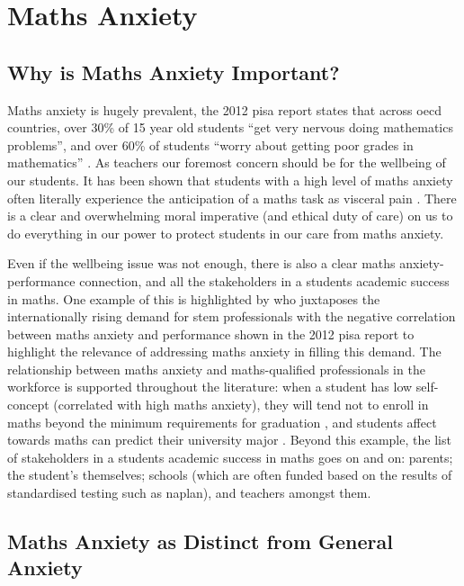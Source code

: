 \documentclass[twoside,12pt,a4paper]{report}
\begin{document}
\section{Maths Anxiety}


\subsection*{Why is Maths Anxiety Important?}

Maths anxiety is hugely prevalent, the 2012 \gls{pisa} report states that across \gls{oecd} countries, over 30\% of 15 year old students ``get very nervous doing mathematics problems'', and over 60\% of students ``worry about getting poor grades in mathematics''  \cite{PISA2013}. As teachers our foremost concern should be for the wellbeing of our students. It has been shown that students with a high level of maths anxiety often literally experience the anticipation of a maths task as visceral pain \cite{Lyons2012pain}. There is a clear and overwhelming moral imperative (and ethical duty of care) on us to do everything in our power to protect students in our care from maths anxiety.

Even if the wellbeing issue was not enough, there is also a clear maths anxiety-performance connection, and all the stakeholders in a students academic success in maths. One example of this is highlighted by  who juxtaposes the internationally rising demand for \gls{stem} professionals with the negative correlation between maths anxiety and performance shown in the 2012 \gls{pisa} report \cite{PISA2013} to highlight the relevance of addressing maths anxiety in filling this demand. The relationship between maths anxiety and maths-qualified professionals in the workforce is supported throughout the literature: when a student has low self-concept (correlated with high maths anxiety), they will tend not to enroll in maths beyond the minimum requirements for graduation \cite{Ashcraft2007book}, and students affect towards maths can predict their university major \cite{LeFevre1992}. Beyond this example, the list of stakeholders in a students academic success in maths goes on and on: parents; the student's themselves; schools (which are often funded based on the results of standardised testing such as \gls{naplan}), and teachers amongst them. 


\subsection*{Maths Anxiety as Distinct from General Anxiety}
\end{document}

